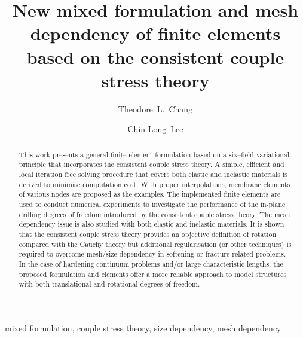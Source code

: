 \documentclass[3p,sort&compress,11pt,fleqn,review]{elsarticle}
\newcommand*{\alert}[1]{#1}
\begin{document}
\begin{abstract}
This work presents a general finite element formulation based on a six--field variational principle that incorporates the consistent couple stress theory. A simple, efficient and local iteration free solving procedure that covers both elastic and inelastic materials is derived to minimise computation cost. With proper interpolations, membrane elements of various nodes are proposed as the examples. The implemented finite elements are used to conduct numerical experiments to investigate the performance of the in-plane drilling degrees of freedom introduced by the consistent couple stress theory. The mesh dependency issue is also studied with both elastic and inelastic materials. It is shown that the consistent couple stress theory provides an objective definition of rotation compared with the Cauchy theory but additional regularisation (or other techniques) is required to overcome mesh/size dependency in softening or fracture related problems. \alert{In the case of hardening continuum problems and/or large characteristic lengths, the proposed formulation and elements offer a more reliable approach to model structures with both translational and rotational degrees of freedom.}
\end{abstract}
\begin{keyword}
mixed formulation\sep
couple stress theory\sep
size dependency\sep
mesh dependency
\end{keyword}
\begin{frontmatter}
\title{New mixed formulation and mesh dependency of finite elements based on the consistent couple stress theory}
\author[]{Theodore~L.~Chang}
\author[]{Chin-Long~Lee}
\address{Department of Civil and Natural Resources Engineering, University of Canterbury, Christchurch, New Zealand, 8041.}
\end{frontmatter}
\end{document}
